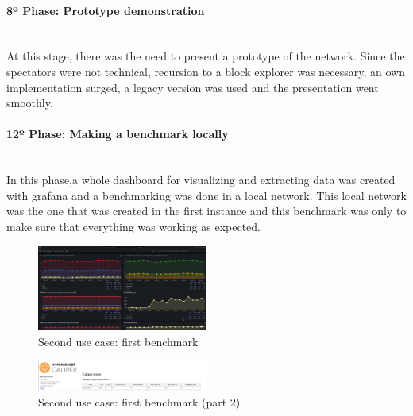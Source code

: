 \paragraph{8º Phase: Prototype demonstration}\mbox{}\\
At this stage, there was the need to present a prototype of the network. Since the spectators were not technical, recursion to a 
block explorer was necessary, an own implementation surged, a legacy version was used and the presentation went smoothly.

\paragraph{12º Phase: Making a benchmark locally}\mbox{}\\
In this phase,a whole dashboard for visualizing and extracting data was created with grafana and a benchmarking was done in a 
local network. This local network was the one that was created in the first instance and this benchmark was only to make sure that 
everything was working as expected.  

\begin{figure}[H]
    \centering
    \includegraphics[width=0.5\textwidth]{assets/use-case-2/first-benchmarking.png} %
    \caption{Second use case: first benchmark}
    \label{fig:sample-image} 
\end{figure}

\begin{figure}[H]
    \centering
    \includegraphics[width=0.5\textwidth]{assets/use-case-2/first-benchmarking2.png} %
    \caption{Second use case: first benchmark (part 2)}
    \label{fig:sample-image} 
\end{figure}

